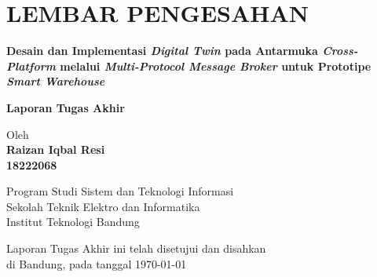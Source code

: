 \chapter*{LEMBAR PENGESAHAN}

\noindent
\begin{minipage}[t]{\textwidth}
\begin{center}
    \vspace{0.5cm}
  {\large\bfseries Desain dan Implementasi \textit{Digital Twin} pada Antarmuka \textit{Cross-Platform} melalui \textit{Multi-Protocol Message Broker} untuk Prototipe \textit{Smart Warehouse}}\\
     \vspace{1cm}

  {\Large \textbf{Laporan Tugas Akhir}}\\


  \vspace{1cm}


  {\large Oleh}\\[0.3cm]
    \textbf{
    {\large Raizan Iqbal Resi}\\
    {\large 18222068}
  }\\

  \vspace{0.5cm}

  {\large Program Studi Sistem dan Teknologi Informasi}\\
  {\large Sekolah Teknik Elektro dan Informatika}\\
  {\large Institut Teknologi Bandung}\\

  \vspace{1cm}

  Laporan Tugas Akhir ini telah disetujui dan disahkan\\
  di Bandung, pada tanggal \today\\[0.5cm]


\end{center}

\vspace{0.5cm}
\noindent



\end{minipage}
